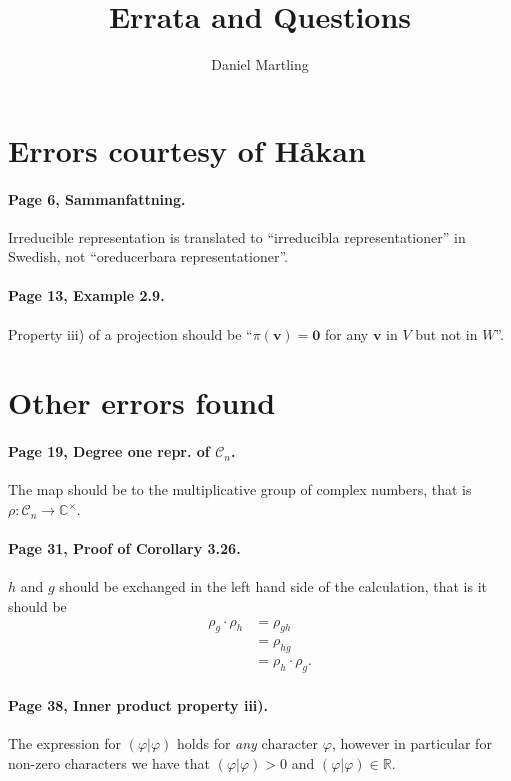 \documentclass[12pt,a4paper]{article}
\title{Errata and Questions}
\author{Daniel Martling}
\date{}
\theoremstyle{definition}
\theoremstyle{remark}
\numberwithin{equation}{section}
\newcommand{\RR}{\mathbb{R}}
\newcommand{\CC}{\mathbb{C}}
\newcommand{\1}{\mathbf{1}}
\newcommand{\0}{\mathbf{0}}
\newcommand{\Cyc}{\mathcal{C}}%
\newcommand{\vvec}{\mathbf{v}}
\begin{document}
	\maketitle
	
	\section*{Errors courtesy of Håkan}
	
		\paragraph{Page 6, Sammanfattning.} Irreducible representation is translated to ``irreducibla representationer'' in Swedish, not ``oreducerbara representationer''.
		
		\paragraph{Page 13, Example 2.9.} Property iii) of a projection should be ``$\pi(\vvec) = \0$ for any $\vvec$ in $V$ but not in $W$''.
		
	\section*{Other errors found}
	
		\paragraph{Page 19, Degree one repr. of $\Cyc_n$.} The map should be to the multiplicative group of complex numbers, that is $\rho: \Cyc_n \rightarrow \CC^\times$.
		
		\paragraph{Page 31, Proof of Corollary 3.26.} $h$ and $g$ should be exchanged in the left hand side of the calculation, that is it should be \begin{align*}
			\rho_g \cdot \rho_h &= \rho_{gh} \\
			&= \rho_{hg} \\
			&= \rho_h \cdot \rho_g.
		\end{align*}
		
		\paragraph{Page 38, Inner product property iii).} The expression for $(\varphi|\varphi)$ holds for \textit{any} character $\varphi$, however in particular for non-zero characters we have that $(\varphi|\varphi) > 0$ and $(\varphi|\varphi) \in \RR$.
		
\end{document}

